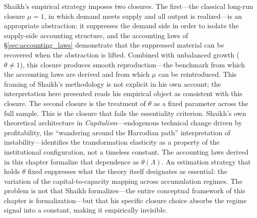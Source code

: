 Shaikh's empirical strategy imposes two closures. The first---the classical long-run closure $\mu = 1$, in which demand meets supply and all output is realized---is an appropriate abstraction: it suppresses the demand side in order to isolate the supply-side accounting structure, and the accounting laws of \S\ref{sec:accounting_laws} demonstrate that the suppressed material can be recovered when the abstraction is lifted. Combined with unbalanced growth ($\theta \neq 1$), this closure produces smooth reproduction---the benchmark from which the accounting laws are derived and from which $\mu$ can be reintroduced. This framing of Shaikh's methodology is not explicit in his own account; the interpretation here presented reads his empirical object as consistent with this closure. The second closure is the treatment of $\theta$ as a fixed parameter across the full sample. This is the closure that fails the essentiality criterion. Shaikh's own theoretical architecture in \emph{Capitalism}---endogenous technical change driven by profitability, the ``wandering around the Harrodian path'' interpretation of instability---identifies the transformation elasticity as a property of the institutional configuration, not a timeless constant. The accounting laws derived in this chapter formalize that dependence as $\theta(\Lambda)$. An estimation strategy that holds $\theta$ fixed suppresses what the theory itself designates as essential: the variation of the capital-to-capacity mapping across accumulation regimes. The problem is not that Shaikh formalizes---the entire conceptual framework of this chapter is formalization---but that his specific closure choice absorbs the regime signal into a constant, making it empirically invisible.



